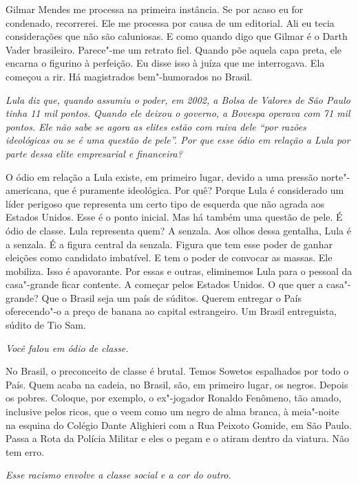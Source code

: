\normalfont
Gilmar Mendes me processa na primeira instância. Se por
acaso eu for condenado, recorrerei. Ele me processa por causa de um
editorial. Ali eu tecia considerações que não são caluniosas. E como
quando digo que Gilmar é o Darth Vader brasileiro. Parece"-me um retrato
fiel. Quando põe aquela capa preta, ele encarna o figurino à perfeição.
Eu disse isso à juíza que me interrogava. Ela começou a rir. Há
magistrados bem"-humorados no Brasil.

\itshape
 Lula diz que, quando assumiu o poder, em 2002, a Bolsa
de Valores de São Paulo tinha 11 mil pontos. Quando ele deixou o
governo, a Bovespa operava com 71 mil pontos. Ele não sabe se agora as
elites estão com raiva dele ``por razões ideológicas ou se é uma questão
de pele''. Por que esse ódio em relação a Lula por parte dessa elite
empresarial e financeira?

\normalfont
O ódio em relação a Lula existe, em primeiro lugar,
devido a uma pressão norte"-americana, que é puramente ideológica.
\protect\hypertarget{_Hlk498163994}{}{}Por quê? Porque Lula é
considerado um líder perigoso que representa um certo tipo de esquerda
que não agrada aos Estados Unidos. Esse é o ponto inicial. Mas há também
uma questão de pele. É ódio de classe. Lula representa quem? A senzala.
Aos olhos dessa gentalha, Lula é a senzala. É a figura central da
senzala. Figura que tem esse poder de ganhar eleições como candidato
imbatível. E tem o poder de convocar as massas. Ele mobiliza. Isso é
apavorante. Por essas e outras, eliminemos Lula para o pessoal da
casa"-grande ficar contente. A começar pelos Estados Unidos. O que quer a
casa"-grande? Que o Brasil seja um país de súditos. Querem entregar o
País oferecendo"-o a preço de banana ao capital estrangeiro. Um Brasil
entreguista, súdito de Tio Sam.

\itshape
 Você falou em ódio de classe.

\normalfont
No Brasil, o preconceito de classe é brutal. Temos
Sowetos espalhados por todo o País. Quem acaba na cadeia, no Brasil,
são, em primeiro lugar, os negros. Depois os pobres. Coloque, por
exemplo, o ex"-jogador Ronaldo Fenômeno, tão amado, inclusive pelos
ricos, que o veem como um negro de alma branca, à meia"-noite na esquina
do Colégio Dante Alighieri com a Rua Peixoto Gomide, em São Paulo. Passa
a Rota da Polícia Militar e eles o pegam e o atiram dentro da viatura.
Não tem erro.

\itshape
 Esse racismo envolve a classe social e a cor do outro.


